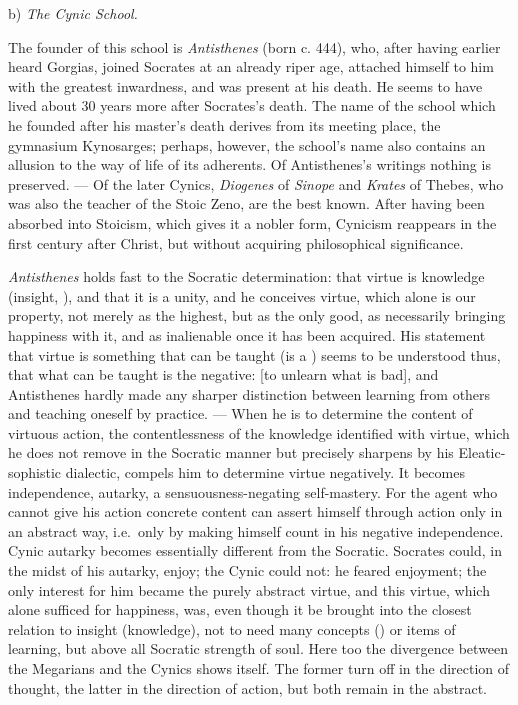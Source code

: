 \begin{center}
b) \emph{The Cynic School.}
\end{center}

The founder of this school is \emph{Antisthenes} (born c. 444), who,
after having earlier heard Gorgias, joined Socrates at an already riper
age, attached himself to him with the greatest inwardness, and was present at his death.
He seems to have lived about 30 years more after Socrates's
death. The name of the school which he founded after his master's death
derives from its meeting place, the gymnasium Kynosarges; perhaps, however, the school's name also contains an allusion to
the way of life of its adherents. Of Antisthenes's writings nothing is
preserved. --- Of the later Cynics, \emph{Diogenes} of \emph{Sinope}
and \emph{Krates} of Thebes, who was also the teacher of the Stoic Zeno,
are the best known. After having been absorbed into Stoicism,
which gives it a nobler form, Cynicism reappears in
the first century after Christ, but without acquiring
philosophical significance.

\emph{Antisthenes} holds fast to the Socratic determination: that
virtue is knowledge (insight, ), and that it is a unity,
and he conceives virtue, which alone is our property, not merely
as the highest, but as the only good, as necessarily
bringing happiness with it, and as inalienable once it
has been acquired. His statement that virtue is something that can
be taught (is a ) seems to be understood thus, that
what can be taught is the negative:  [to unlearn what is bad], and
Antisthenes hardly made any sharper distinction between learning from others and teaching oneself by practice. --- When he
is to determine the content of virtuous action, the contentlessness of the knowledge
identified with virtue, which he does not remove
in the Socratic manner but precisely sharpens by his Eleatic-sophistic
dialectic, compels him to determine virtue negatively.
It becomes independence, autarky, a sensuousness-negating
self-mastery. For the agent who cannot give
his action concrete content can assert himself through action only
in an abstract way, i.e.\ only by making himself count in his
negative independence. Cynic autarky becomes essentially different from the Socratic. Socrates could, in the midst of his
autarky, enjoy; the Cynic could not: he feared enjoyment; the only interest for him became the purely abstract
virtue, and this virtue, which alone sufficed for happiness, was,
even though it be brought into the closest relation to insight
(knowledge), not to need many concepts () or items of learning,
but above all Socratic strength of soul. Here too the divergence between the Megarians and the Cynics shows itself. The former turn off in
the direction of thought, the latter in the direction of action, but both
remain in the abstract.

